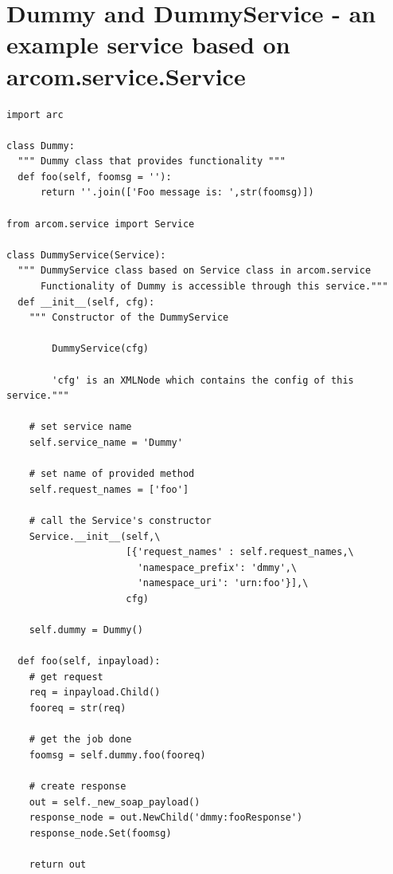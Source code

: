 \documentclass{article}
\begin{document}
\section{Dummy and DummyService - an example service based on arcom.service.Service}
\label{DummyServiceCode}
\begin{verbatim}
import arc

class Dummy:
  """ Dummy class that provides functionality """
  def foo(self, foomsg = ''):
      return ''.join(['Foo message is: ',str(foomsg)])

from arcom.service import Service

class DummyService(Service):
  """ DummyService class based on Service class in arcom.service 
      Functionality of Dummy is accessible through this service."""
  def __init__(self, cfg):
    """ Constructor of the DummyService
        
        DummyService(cfg)
        
        'cfg' is an XMLNode which contains the config of this service."""
    
    # set service name
    self.service_name = 'Dummy'
    
    # set name of provided method
    self.request_names = ['foo']
    
    # call the Service's constructor
    Service.__init__(self,\
                     [{'request_names' : self.request_names,\
                       'namespace_prefix': 'dmmy',\
                       'namespace_uri': 'urn:foo'}],\
                     cfg)
    
    self.dummy = Dummy()
    
  def foo(self, inpayload):
    # get request
    req = inpayload.Child()
    fooreq = str(req)
    
    # get the job done    
    foomsg = self.dummy.foo(fooreq)
    
    # create response
    out = self._new_soap_payload()
    response_node = out.NewChild('dmmy:fooResponse')    
    response_node.Set(foomsg)
    
    return out
\end{verbatim}
\end{document}
